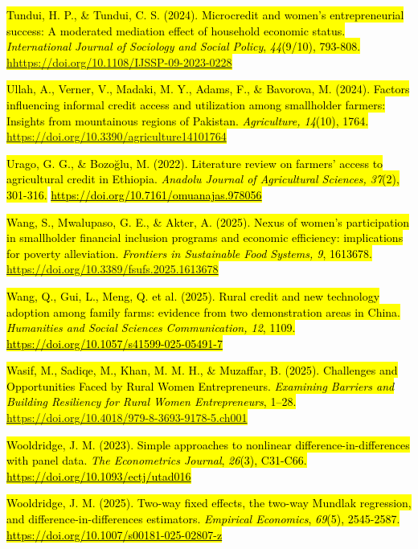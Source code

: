 \documentclass[
]{article}
\begin{document}
\hl{Tundui, H. P., \& Tundui, C. S. (2024). Microcredit and women's
entrepreneurial success: A moderated mediation effect of household
economic status. \emph{International Journal of Sociology and Social
Policy}, \emph{44}(9/10), 793-808.
\mbox{\href{https://doi.org/10.1108/IJSSP-09-2023-0228}{\mbox{\href{https://doi.org/10.1108/IJSSP-09-2023-0228}{hhttps://doi.org/10.1108/IJSSP-09-2023-0228}}}}}

\hl{Ullah, A., Verner, V., Madaki, M. Y., Adams, F., \& Bavorova, M.
(2024). Factors influencing informal credit access and utilization among
smallholder farmers: Insights from mountainous regions of Pakistan.
\emph{Agriculture, 14}(10), 1764.
\mbox{\url{https://doi.org/10.3390/agriculture14101764}}}

\hl{Urago, G. G., \& Bozoğlu, M. (2022). Literature review on farmers'
access to agricultural credit in Ethiopia. \emph{Anadolu Journal of
Agricultural Sciences, 37}(2), 301-316.}
\href{https://doi.org/10.7161/omuanajas.978056}{\hl{https://doi.org/10.7161/omuanajas.978056}}

\hl{Wang, S., Mwalupaso, G. E., \& Akter, A. (2025). Nexus of women's
participation in smallholder financial inclusion programs and economic
efficiency: implications for poverty alleviation. \emph{Frontiers in
Sustainable Food Systems, 9}, 1613678.
\mbox{\url{https://doi.org/10.3389/fsufs.2025.1613678}}}

\hl{Wang, Q., Gui, L., Meng, Q. et al. (2025). Rural credit and new
technology adoption among family farms: evidence from two demonstration
areas in China. \emph{Humanities and Social Sciences Communication, 12},
1109.}
\href{https://doi.org/10.1057/s41599-025-05491-7}{\hl{https://doi.org/10.1057/s41599-025-05491-7}}

\hl{Wasif, M., Sadiqe, M., Khan, M. M. H., \& Muzaffar, B. (2025).
Challenges and Opportunities Faced by Rural Women Entrepreneurs.
\emph{Examining Barriers and Building Resiliency for Rural Women
Entrepreneurs}, 1--28.
\mbox{\url{https://doi.org/10.4018/979-8-3693-9178-5.ch001}}}

\hl{Wooldridge, J. M. (2023). Simple approaches to nonlinear
difference-in-differences with panel data. \emph{The Econometrics
Journal}, \emph{26}(3), C31-C66.}
\href{https://doi.org/10.1093/ectj/utad016}{\hl{https://doi.org/10.1093/ectj/utad016}}

\hl{Wooldridge, J. M. (2025). Two-way fixed effects, the two-way Mundlak
regression, and difference-in-differences estimators. \emph{Empirical
Economics}, \emph{69}(5), 2545-2587.}
\href{https://doi.org/10.1007/s00181-025-02807-z}{\hl{https://doi.org/10.1007/s00181-025-02807-z}}
\end{document}
